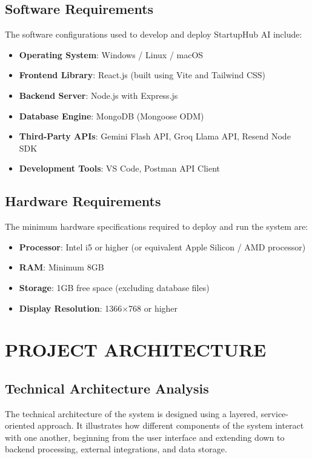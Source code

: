 \documentclass[12pt,a4paper]{report}
\begin{document}
\section{Software Requirements}
The software configurations used to develop and deploy StartupHub AI include:
\begin{itemize}
    \item \textbf{Operating System}: Windows / Linux / macOS
    \item \textbf{Frontend Library}: React.js (built using Vite and Tailwind CSS)
    \item \textbf{Backend Server}: Node.js with Express.js
    \item \textbf{Database Engine}: MongoDB (Mongoose ODM)
    \item \textbf{Third-Party APIs}: Gemini Flash API, Groq Llama API, Resend Node SDK
    \item \textbf{Development Tools}: VS Code, Postman API Client
\end{itemize}

\section{Hardware Requirements}
The minimum hardware specifications required to deploy and run the system are:
\begin{itemize}
    \item \textbf{Processor}: Intel i5 or higher (or equivalent Apple Silicon / AMD processor)
    \item \textbf{RAM}: Minimum 8GB
    \item \textbf{Storage}: 1GB free space (excluding database files)
    \item \textbf{Display Resolution}: 1366$\times$768 or higher
\end{itemize}

\chapter{PROJECT ARCHITECTURE}

\section{Technical Architecture Analysis}
The technical architecture of the system is designed using a layered, service-oriented approach. It illustrates how different components of the system interact with one another, beginning from the user interface and extending down to backend processing, external integrations, and data storage.
\end{document}

